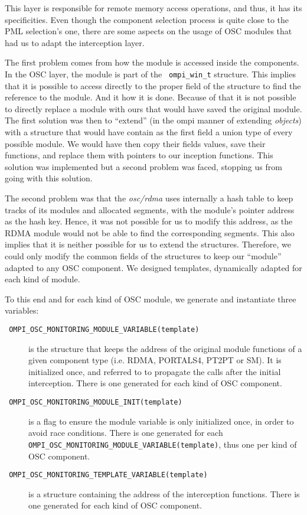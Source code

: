 \documentclass[notitlepage]{article}
\newcommand{\brkunds}[0]{\allowbreak\_}
\begin{document}
This layer is responsible for remote memory access operations, and
thus, it has its specificities. Even though the component selection
process is quite close to the PML selection's one, there are some
aspects on the usage of OSC modules that had us to adapt the
interception layer.

The first problem comes from how the module is accessed inside the
components. In the OSC layer, the module is part of the {\tt
  ompi\brkunds{}win\brkunds{}t} structure. This implies that it is
possible to access directly to the proper field of the structure to
find the reference to the module. And it how it is done. Because of
that it is not possible to directly replace a module with ours that
would have saved the original module. The first solution was then to
``extend'' (in the ompi manner of extending {\it objects}) with a
structure that would have contain as the first field a union type of
every possible module. We would have then copy their fields values,
save their functions, and replace them with pointers to our inception
functions. This solution was implemented but a second problem was
faced, stopping us from going with this solution.

The second problem was that the {\it osc/rdma} uses internally a hash
table to keep tracks of its modules and allocated segments, with the
module's pointer address as the hash key. Hence, it was not possible
for us to modify this address, as the RDMA module would not be able to
find the corresponding segments. This also implies that it is neither
possible for us to extend the structures. Therefore, we could only
modify the common fields of the structures to keep our ``module''
adapted to any OSC component. We designed templates, dynamically
adapted for each kind of module.

To this end and for each kind of OSC module, we generate and
instantiate three variables:
\begin{description}
\item[{\tt
    OMPI\brkunds{}OSC\brkunds{}MONITORING\brkunds{}MODULE\brkunds{}VARIABLE(template)}]
  is the structure that keeps the address of the original module
  functions of a given component type (i.e. RDMA, PORTALS4, PT2PT or
  SM). It is initialized once, and referred to to propagate the calls
  after the initial interception. There is one generated for each kind
  of OSC component.
\item[{\tt
    OMPI\brkunds{}OSC\brkunds{}MONITORING\brkunds{}MODULE\brkunds{}INIT(template)}]
  is a flag to ensure the module variable is only initialized once, in
  order to avoid race conditions. There is one generated for each {\tt
    OMPI\brkunds{}OSC\brkunds{}MONITORING\brkunds{}MODULE\brkunds{}VARIABLE(template)},
  thus one per kind of OSC component.
\item[{\tt
    OMPI\brkunds{}OSC\brkunds{}MONITORING\brkunds{}TEMPLATE\brkunds{}VARIABLE(template)}]
  is a structure containing the address of the interception
  functions. There is one generated for each kind of OSC component.
\end{description}
\end{document}
